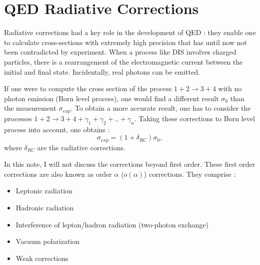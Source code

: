
\section{QED Radiative Corrections}

Radiative corrections had a key role in the development of QED : they enable one to calculate cross-sections with extremely high precision that has until now not been contradicted by experiment. When a process like DIS involves charged particles, there is a rearrangement of the electromagnetic current between the initial and final state. Incidentally, real photons can be emitted.

If one were to compute the cross section of the process $1+2 \rightarrow 3+4$ with no photon emission (Born level process), one would find a different result $\sigma_{0}$ than the measurement $\sigma_{exp}$. To obtain a more accurate result, one has to consider the processes $1+2 \rightarrow 3+4+\gamma_1+\gamma_2+..+\gamma_n$. Taking these corrections to Born level process into account, one obtains :
%
\begin{equation} \label{eq:RC}
  \sigma_{exp} = (1+\delta_{RC})\sigma_0,
\end{equation}
%
where $\delta_{RC}$ are the radiative corrections.


In this note, I will not discuss the corrections beyond first order. These first order corrections are also known as order $\alpha$
($o(\alpha)$) corrections. They comprise :
\begin{itemize}
\item Leptonic radiation
\item Hadronic radiation
\item Interference of lepton/hadron radiation (two-photon exchange)
\item Vacuum polarization
\item Weak corrections
\end{itemize}

